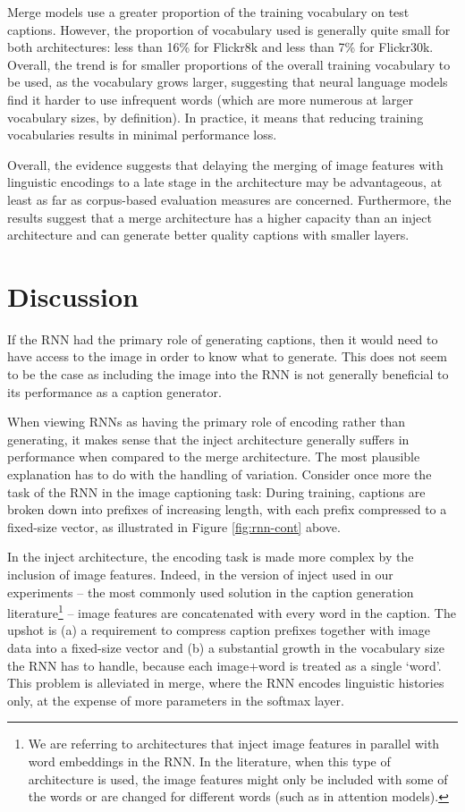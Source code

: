 \documentclass[11pt,letterpaper]{article}
\begin{document}
Merge models use a greater proportion of the training vocabulary on test captions. However, the proportion of vocabulary used is generally quite small for both architectures: less than 16\% for Flickr8k and less than 7\% for Flickr30k. Overall, the trend is for smaller proportions of the overall training vocabulary to be used, as the vocabulary grows larger, suggesting that neural language models find it harder to use infrequent words (which are more numerous at larger vocabulary sizes, by definition). In practice, it means that reducing training vocabularies results in minimal performance loss.

Overall, the evidence suggests that delaying the merging of image features with linguistic encodings to a late stage in the architecture may be advantageous, at least as far as corpus-based evaluation measures are concerned. Furthermore, the results suggest that a merge architecture has a higher capacity than an inject architecture and can generate better quality captions with smaller layers.

\section{Discussion}

If the RNN had the primary role of generating captions, then it would need to have access to the image in order to know what to generate. This does not seem to be the case as including the image into the RNN is not generally beneficial to its performance as a caption generator.

When viewing RNNs as having the primary role of encoding rather than generating, it makes sense that the inject architecture generally suffers in performance when compared to the merge architecture. The most plausible explanation has to do with the handling of variation. Consider once more the task of the RNN in the image captioning task: During training, captions are broken down into prefixes of increasing length, with each prefix compressed to a fixed-size vector, as illustrated in Figure \ref{fig:rnn-cont} above. 

In the inject architecture, the encoding task is made more complex by the inclusion of image features. Indeed, in the version of inject used in our experiments -- the most commonly used solution in the caption generation literature\footnote{We are referring to architectures that inject image features in parallel with word embeddings in the RNN. In the literature, when this type of architecture is used, the image features might only be included with some of the words or are changed for different words (such as in attention models).} -- image features are concatenated with every word in the caption. The upshot is (a) a requirement to compress caption prefixes together with image data into a fixed-size vector and (b) a substantial growth in the vocabulary size the RNN has to handle, because each image+word is treated as a single `word'. This problem is alleviated in merge, where the RNN encodes linguistic histories only, at the expense of more parameters in the softmax layer.
\end{document}
